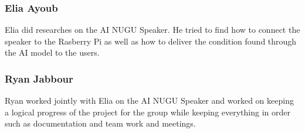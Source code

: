 \subsubsection{\textbf{Elia Ayoub}}
Elia did researches on the AI NUGU Speaker. He tried to find how to connect the speaker to the Rasberry Pi as well as how to deliver the condition found through the AI model to the users.\\
\subsubsection{\textbf{Ryan Jabbour}}
Ryan worked jointly with Elia on the AI NUGU Speaker and worked on keeping a logical progress of the project for the group while keeping everything in order such as documentation and team work and meetings.\\